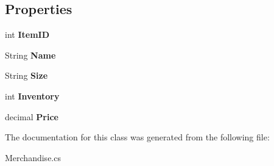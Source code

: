 \subsection*{Properties}
\begin{DoxyCompactItemize}
\item 
\mbox{\label{class_nexus_1_1_merchandise_a272d5248878955d99b6ce88f2c4cc732}} 
int {\bfseries Item\+ID}
\item 
\mbox{\label{class_nexus_1_1_merchandise_a1afac22e57c2e0b5afe5f7df9a5cd846}} 
String {\bfseries Name}
\item 
\mbox{\label{class_nexus_1_1_merchandise_a5aa2201d7a1d313a18f101868d53c983}} 
String {\bfseries Size}
\item 
\mbox{\label{class_nexus_1_1_merchandise_a3d0dfff55eb5ebb790b2f5f3f0de0b6d}} 
int {\bfseries Inventory}
\item 
\mbox{\label{class_nexus_1_1_merchandise_a8516b376a64a69f533c429c330e2847a}} 
decimal {\bfseries Price}
\end{DoxyCompactItemize}


The documentation for this class was generated from the following file\+:\begin{DoxyCompactItemize}
\item 
Merchandise.\+cs\end{DoxyCompactItemize}
